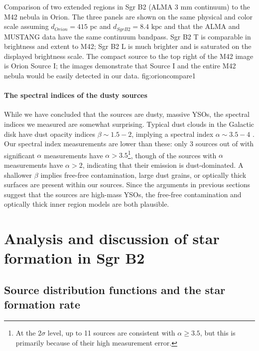 \documentclass[twocolumn]{aastex61}
\newcommand{\dsgrb}{\ensuremath{8.4\textrm{~kpc}}\xspace}
\begin{document}
{Comparison of two extended \hii regions in Sgr B2 (ALMA 3 mm continuum) to the
M42 \citep[GBT MUSTANG 3 mm continuum;][]{Dicker2009a} nebula in Orion.
The three panels are shown on the same physical and color scale assuming
$d_{Orion} = 415$ pc and $d_{Sgr B2} = $\dsgrb and that the ALMA and MUSTANG
data have the same continuum bandpass.  Sgr B2 \hii T is comparable in
brightness and extent to M42; Sgr B2 \hii L is much brighter and is saturated
on the displayed brightness scale.  The compact source to the top right of the
M42 image is Orion Source I; the images demonstrate that Source I and the entire
M42 nebula would be easily detected in our data.
}
{fig:orioncompare}{1}{\textwidth}

\paragraph{The spectral indices of the dusty sources}
While we have concluded that the sources are dusty, massive YSOs, the
spectral indices we measured are somewhat surprising.  Typical dust clouds in
the Galactic disk have dust opacity indices $\beta\sim1.5-2$, implying 
a spectral index $\alpha\sim3.5-4$
\citep[$\beta=\alpha-2$;][]{Schnee2010a,Shirley2011a,Sadavoy2016a}.  Our spectral index measurements
are lower
than these:  only 3 sources out of \nalphas with significant $\alpha$
measurements have $\alpha > 3.5$\footnote{At the
$2\sigma$ level, up to 11 sources are consistent with $\alpha\geq3.5$, but this is
primarily because of their high measurement error.}, though \ngttwo of the
sources with $\alpha$ measurements have $\alpha>2$, indicating that their
emission is dust-dominated.  A shallower $\beta$ implies free-free
contamination, large dust grains, or optically thick surfaces are present
within our sources.  Since the arguments in previous sections suggest that the
sources are high-mass YSOs, the free-free contamination and optically thick
inner region models are both plausible.

\section{Analysis and discussion of star formation in Sgr B2}
\label{sec:sfdiscussion}
\subsection{Source distribution functions and the star formation rate}
\label{sec:distributionsandsfr}
\end{document}
